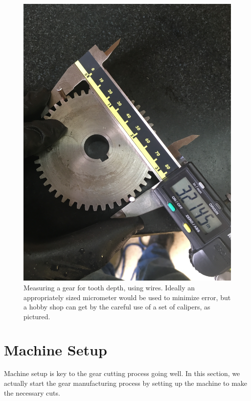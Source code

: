 \documentclass[12pt,twoside,letterpaper]{article}
\begin{document}
\begin{figure}[H]
	\centering
\includegraphics[width=5in]{gearMeasure}
	\caption{Measuring a gear for tooth depth, using wires. Ideally an appropriately sized micrometer would be used to minimize error, but a hobby shop can get by the careful use of a set of calipers, as pictured.}
\end{figure}

\clearpage

 
\clearpage
\section{Machine Setup}
Machine setup is key to the gear cutting process going well.  In this section, we actually start the gear manufacturing process by setting up the machine to make the necessary cuts.
\end{document}
